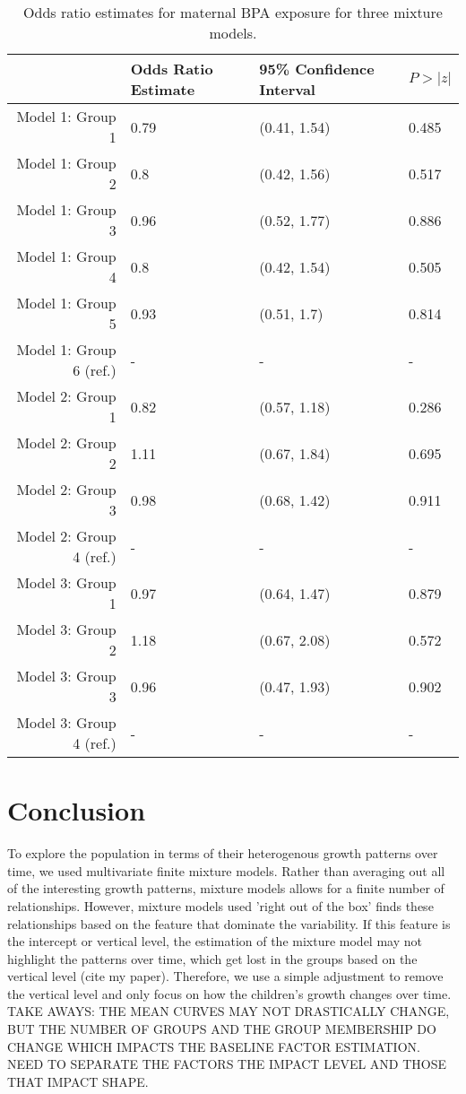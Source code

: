 \documentclass[11pt]{article}
\begin{document}
\begin{table}[ht]
\begin{center}
\begin{tabular}{rlll}
  \hline
 & Odds Ratio Estimate & 95\% Confidence Interval & $P>|z|$ \\ 
  \hline
Model 1: Group  1 & 0.79 & (0.41, 1.54) & 0.485 \\ 
  Model 1: Group  2 & 0.8 & (0.42, 1.56) & 0.517 \\ 
  Model 1: Group  3 & 0.96 & (0.52, 1.77) & 0.886 \\ 
  Model 1: Group  4 & 0.8 & (0.42, 1.54) & 0.505 \\ 
  Model 1: Group  5 & 0.93 & (0.51, 1.7) & 0.814 \\ 
  Model 1: Group  6  (ref.) & - & - & - \\ 
  Model 2: Group  1 & 0.82 & (0.57, 1.18) & 0.286 \\ 
  Model 2: Group  2 & 1.11 & (0.67, 1.84) & 0.695 \\ 
  Model 2: Group  3 & 0.98 & (0.68, 1.42) & 0.911 \\ 
  Model 2: Group  4  (ref.) & - & - & - \\ 
  Model 3: Group  1 & 0.97 & (0.64, 1.47) & 0.879 \\ 
  Model 3: Group  2 & 1.18 & (0.67, 2.08) & 0.572 \\ 
  Model 3: Group  3 & 0.96 & (0.47, 1.93) & 0.902 \\ 
  Model 3: Group  4  (ref.) & - & - & - \\ 
   \hline
\end{tabular}
\caption{Odds ratio estimates for maternal BPA exposure for three mixture models. }
\end{center}
\end{table}

\section{Conclusion}
To explore the population in terms of their heterogenous growth patterns over time, we used multivariate finite mixture models. Rather than averaging out all of the interesting growth patterns, mixture models allows for a finite number of relationships. However, mixture models used 'right out of the box' finds these relationships based on the feature that dominate the variability. If this feature is the intercept or vertical level, the estimation of the mixture model may not highlight the patterns over time, which get lost in the groups based on the vertical level (cite my paper). Therefore, we use a simple adjustment to remove the vertical level and only focus on how the children's growth changes over time.\\

TAKE AWAYS: THE MEAN CURVES MAY NOT DRASTICALLY CHANGE, BUT THE NUMBER OF GROUPS AND THE GROUP MEMBERSHIP DO CHANGE WHICH IMPACTS THE BASELINE FACTOR ESTIMATION. NEED TO SEPARATE THE FACTORS THE IMPACT LEVEL AND THOSE THAT IMPACT SHAPE. 
\end{document}
